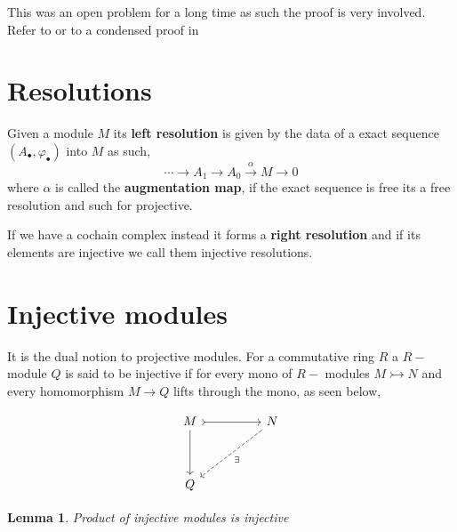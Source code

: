 \documentclass[12pt]{article}
\numberwithin{equation}{section}
\newtheorem{lemma}[theorem]{Lemma}
\begin{document}
	This was an open problem for a long time as such the proof is very involved. Refer to \cite{nlab:quillen-suslin_theorem} or to a condensed proof in \cite[p. ~848]{lang02}

		\section{Resolutions}
	Given a module $M$ its \textbf{left resolution} is given by the data of a exact sequence $(A_\bullet, \varphi_\bullet)$ into $M$ as such,
	\[ 	\cdots \to A_1	\to A_0 \xrightarrow{\alpha} M \to 0 \]
	where $\alpha $ is called the \textbf{augmentation map}, if the exact sequence is free its a free resolution and such for projective. 
	
	If we have a cochain complex instead it forms a \textbf{right resolution} and if its elements are injective we call them injective resolutions.
	
	
	
	\section{Injective modules}
	It is the dual notion to projective modules. For a commutative ring $R$ a $R-$module $Q$ is said to be injective if for every mono of $R-$ modules $M \rightarrowtail N$ and every homomorphism $ M \to Q$ lifts through the mono, as seen below,
		
	\[\begin{tikzcd}
		M && N \\
		\\
		Q
		\arrow[ tail, from=1-1, to=1-3]
		\arrow[ from=1-1, to=3-1]
		\arrow["{\exists}", dashed, from=1-3, to=3-1]
	\end{tikzcd}\]
	
	\begin{lemma}
		Product of injective modules is injective
	\end{lemma}
	
\end{document}
